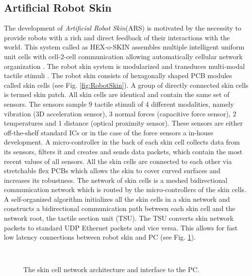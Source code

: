 \subsection{Artificial Robot Skin}
The development of \textit{Artificial Robot Skin}(ARS) is motivated by the necessity to provide robots with a rich and direct feedback of their interactions with the world. This system called as HEX-o-SKIN assembles multiple intelligent uniform unit cells with cell-2-cell communication allowing automatically cellular network organization \cite{mittendorfer2012uniform}. The robot skin system is modularized and transduces multi-modal tactile stimuli \cite{MittendorferYC15}. The robot skin consists of hexagonally shaped PCB modules called skin cells (see Fig. \ref{fig:RobotSkin}). A group of directly connected skin cells is termed skin patch. All skin cells are identical and contain the same set of sensors. The sensors sample 9 tactile stimuli of 4 different modalities, namely vibration (3D acceleration sensor), 3 normal forces (capacitive force sensor), 2 temperatures and 1 distance (optical proximity sensor). These sensors are either off-the-shelf standard ICs or in the case of the force sensors a in-house development. A micro-controller in the back of each skin cell collects data from its sensors, filters it and creates and sends data packets, which contain the most recent values of all sensors. All the skin cells are connected to each other via stretchable flex PCBs which allows the skin to cover curved surfaces and increases its robustness. The network of skin cells is a meshed bidirectional communication network which is routed by the micro-controllers of the skin cells. A self-organized algorithm initializes all the skin cells in a skin network and constructs a bidirectional communication path between each skin cell and the network root, the tactile section unit (TSU). The TSU converts skin network packets to standard UDP Ethernet packets and vice versa. This allows for fast low latency connections between robot skin and PC (see Fig. \ref{fig:SkinCellNetworkArchitecture}).
\begin{figure}[t]
\centering
{}\\[-15pt]
\caption[]{The skin cell network architecture and interface to the PC.}
\label{fig:SkinCellNetworkArchitecture}
\vspace{-10pt}
\end{figure}
